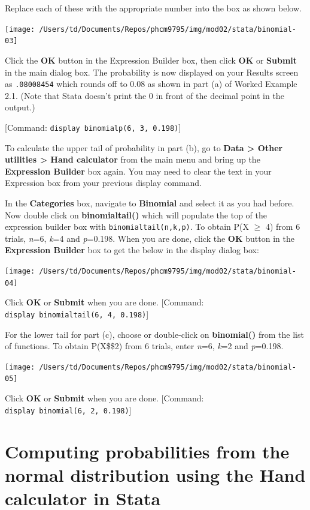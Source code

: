 \documentclass[
]{memoir}
\begin{document}
Replace each of these with the appropriate number into the box as shown below.

\texttt{[image: /Users/td/Documents/Repos/phcm9795/img/mod02/stata/binomial-03]}

Click the \textbf{OK} button in the Expression Builder box, then click \textbf{OK} or \textbf{Submit} in the main dialog box. The probability is now displayed on your Results screen as \texttt{.08008454} which rounds off to 0.08 as shown in part (a) of Worked Example 2.1. (Note that Stata doesn't print the 0 in front of the decimal point in the output.)

{[}Command: \texttt{display\ binomialp(6,\ 3,\ 0.198)}{]}

To calculate the upper tail of probability in part (b), go to \textbf{Data \textgreater{} Other utilities \textgreater{} Hand calculator} from the main menu and bring up the \textbf{Expression Builder} box again. You may need to clear the text in your Expression box from your previous display command.

In the \textbf{Categories} box, navigate to \textbf{Binomial} and select it as you had before. Now double click on \textbf{binomialtail()} which will populate the top of the expression builder box with \texttt{binomialtail(n,k,p)}. To obtain P(X \(\ge\) 4) from 6 trials, \emph{n}=6, \emph{k}=4 and \emph{p}=0.198. When you are done, click the \textbf{OK} button in the \textbf{Expression Builder} box to get the below in the display dialog box:

\texttt{[image: /Users/td/Documents/Repos/phcm9795/img/mod02/stata/binomial-04]}

Click \textbf{OK} or \textbf{Submit} when you are done. {[}Command: \texttt{display\ binomialtail(6,\ 4,\ 0.198)}{]}

For the lower tail for part (c), choose or double-click on \textbf{binomial()} from the list of functions. To obtain P(X\$\le\$2) from 6 trials, enter \emph{n}=6, \emph{k}=2 and \emph{p}=0.198.

\texttt{[image: /Users/td/Documents/Repos/phcm9795/img/mod02/stata/binomial-05]}

Click \textbf{OK} or \textbf{Submit} when you are done. {[}Command: \texttt{display\ binomial(6,\ 2,\ 0.198)}{]}

\hypertarget{computing-probabilities-from-the-normal-distribution-using-the-hand-calculator-in-stata}{%
\section{Computing probabilities from the normal distribution using the Hand calculator in Stata}\label{computing-probabilities-from-the-normal-distribution-using-the-hand-calculator-in-stata}}
\end{document}
